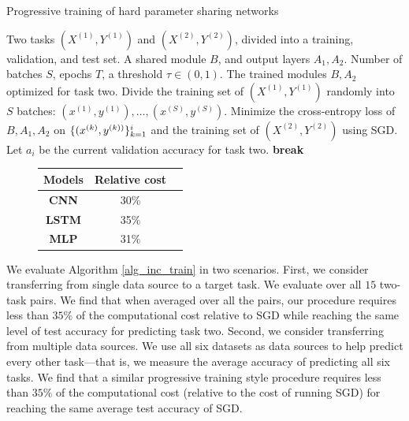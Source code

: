 \begin{algorithm}[!h]
	\caption{Progressive training of hard parameter sharing networks}
	\label{alg_inc_train}
	\begin{algorithmic}[1]
		\Input Two tasks $(X^{(1)}, Y^{(1)})$ and $(X^{(2)}, Y^{(2)})$, divided into a training, validation, and test set.
		\Param A shared module $B$, and output layers $A_1, A_2$.
		\Req Number of batches $S$, epochs $T$, a threshold $\tau\in(0,1)$.
		\Output The trained modules $B, A_2$ optimized for task two.
		\State Divide the training set of $(X^{(1)}, Y^{(1)})$ randomly into $S$ batches: $(x^{(1)}, y^{(1)}), \dots, (x^{(S)}, y^{(S)})$.
		\State Minimize the cross-entropy loss of $B, A_1, A_2$ on  $\{(x^{(k)}, y^{(k))}\}_{k=1}^i$ and the training set of $(X^{(2)}, Y^{(2)})$ using SGD.
		\EndFor
		\State Let $a_i$ be the current validation accuracy for task two.
		\State \textbf{break}
		\EndIf
		\EndFor
	\end{algorithmic}
\end{algorithm}

\smallskip
\begin{figure}
	\vspace{-0.15in}
	\centering
	\begin{tabular}{c c c}
		\toprule
		Models & Relative cost \\
		\midrule
		{\bf CNN}  & 30\% \\
		{\bf LSTM} & 35\% \\
		{\bf MLP}  & 31\%  \\
		\bottomrule
		\end{tabular}
		\label{tab:taskonomy}
	\label{fig_intro_arch}
\end{figure}
We evaluate Algorithm \ref{alg_inc_train} in two scenarios.
First, we consider transferring from single data source to a target task.
We evaluate over all $15$ two-task pairs.
We find that when averaged over all the pairs, our procedure requires less than $35\%$ of the computational cost relative to SGD while reaching the same level of test accuracy for predicting task two.
Second, we consider transferring from multiple data sources.
We use all six datasets as data sources to help predict every other task---that is, we measure the average accuracy of predicting all six tasks.
We find that a similar progressive training style procedure requires less than $35\%$ of the computational cost (relative to the cost of running SGD) for reaching the same average test accuracy of SGD.

